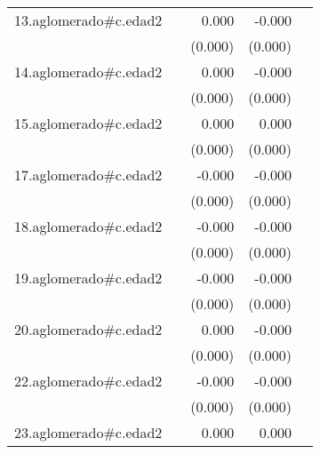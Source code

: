 {\begin{longtable}{l*{4}{D{.}{.}{-1}}}
\addlinespace
13.aglomerado#c.edad2&                     &       0.000         &      -0.000\sym{**} &                     \\
            &                     &     (0.000)         &     (0.000)         &                     \\
\addlinespace
14.aglomerado#c.edad2&                     &       0.000\sym{*}  &      -0.000         &                     \\
            &                     &     (0.000)         &     (0.000)         &                     \\
\addlinespace
15.aglomerado#c.edad2&                     &       0.000         &       0.000         &                     \\
            &                     &     (0.000)         &     (0.000)         &                     \\
\addlinespace
17.aglomerado#c.edad2&                     &      -0.000         &      -0.000\sym{*}  &                     \\
            &                     &     (0.000)         &     (0.000)         &                     \\
\addlinespace
18.aglomerado#c.edad2&                     &      -0.000         &      -0.000\sym{*}  &                     \\
            &                     &     (0.000)         &     (0.000)         &                     \\
\addlinespace
19.aglomerado#c.edad2&                     &      -0.000         &      -0.000         &                     \\
            &                     &     (0.000)         &     (0.000)         &                     \\
\addlinespace
20.aglomerado#c.edad2&                     &       0.000         &      -0.000         &                     \\
            &                     &     (0.000)         &     (0.000)         &                     \\
\addlinespace
22.aglomerado#c.edad2&                     &      -0.000         &      -0.000\sym{*}  &                     \\
            &                     &     (0.000)         &     (0.000)         &                     \\
\addlinespace
23.aglomerado#c.edad2&                     &       0.000\sym{**} &       0.000\sym{*}  &                     \\

\end{longtable}}
